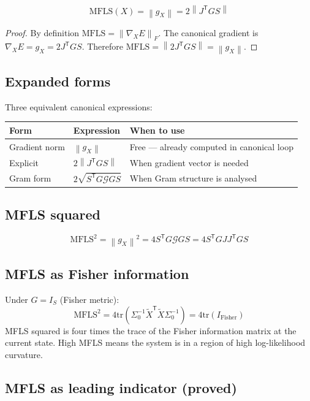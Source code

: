 \documentclass[11pt,a4paper]{article}
\theoremstyle{definition}
\newcommand{\T}{^{\mathsf{T}}}
\newcommand{\norm}[1]{\left\|#1\right\|}
\newcommand{\gX}{g_X}
\newcommand{\tr}{\mathrm{tr}}
\newcommand{\mfls}{\mathrm{MFLS}}
\begin{document}
\begin{lockedbox}
\[
\mfls(X) = \norm{\gX} = 2\norm{J\T GS}
\]
\end{lockedbox}

\begin{proof}
By definition $\mfls = \norm{\nabla_X E}_F$.
The canonical gradient is $\nabla_X E = \gX = 2J\T GS$.
Therefore $\mfls = \norm{2J\T GS} = \norm{\gX}$.
\end{proof}

\subsection{Expanded forms}

Three equivalent canonical expressions:

\begin{center}
\begin{tabular}{lll}
\toprule
Form & Expression & When to use \\
\midrule
Gradient norm & $\norm{\gX}$ & Free — already computed in canonical loop \\
Explicit & $2\norm{J\T GS}$ & When gradient vector is needed \\
Gram form & $2\sqrt{S\T G\mathcal{G}GS}$ & When Gram structure is analysed \\
\bottomrule
\end{tabular}
\end{center}

\subsection{MFLS squared}

\[
\mfls^2 = \norm{\gX}^2 = 4S\T G\mathcal{G}GS = 4S\T G J J\T G S
\]

\subsection{MFLS as Fisher information}

Under $G = I_S$ (Fisher metric):
\[
\mfls^2 = 4\tr(\Sigma_0^{-1}\tilde X\T \tilde X \Sigma_0^{-1}) = 4\tr(I_\mathrm{Fisher})
\]
MFLS squared is four times the trace of the Fisher information matrix at the current state.
High MFLS means the system is in a region of high log-likelihood curvature.

\subsection{MFLS as leading indicator (proved)}
\end{document}
